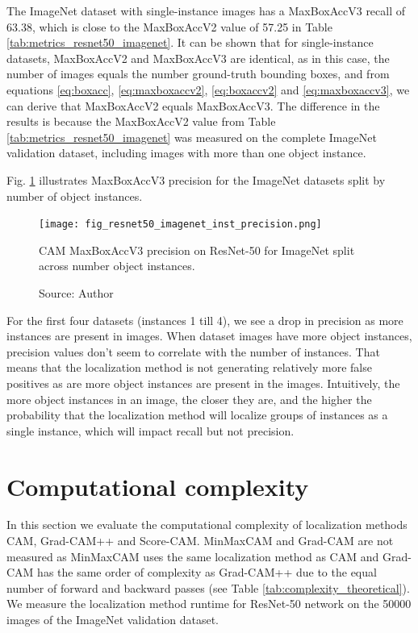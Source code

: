 The ImageNet dataset with single-instance images has a MaxBoxAccV3 recall of 63.38, which is close to the MaxBoxAccV2 value of 57.25 in Table \ref{tab:metrics_resnet50_imagenet}. It can be shown that for single-instance datasets, MaxBoxAccV2 and MaxBoxAccV3 are identical, as in this case, the number of images equals the number ground-truth bounding boxes, and from equations \ref{eq:boxacc}, \ref{eq:maxboxaccv2}, \ref{eq:boxaccv2} and \ref{eq:maxboxaccv3}, we can derive that MaxBoxAccV2 equals MaxBoxAccV3. The difference in the results is because the MaxBoxAccV2 value from Table \ref{tab:metrics_resnet50_imagenet} was measured on the complete ImageNet validation dataset, including images with more than one object instance.

Fig. \ref{fig:resnet50_imagenet_inst_precision} illustrates MaxBoxAccV3 precision for the ImageNet datasets split by number of object instances.

\begin{figure}[h]
    \begin{center}       
    \texttt{[image: fig\_resnet50\_imagenet\_inst\_precision.png]}
    \caption[CAM MaxBoxAccV3 precision on ResNet-50 for ImageNet split across number object instances]{CAM MaxBoxAccV3 precision on ResNet-50 for ImageNet split across number object instances.}
    \caption*{Source: Author}
    \label{fig:resnet50_imagenet_inst_precision}
    \end{center}
\end{figure}

For  the first four datasets (instances 1 till 4), we see a drop in precision as more instances are present in images. When dataset images have more object instances, precision values don't seem to correlate with the number of instances. That means that the localization method is not generating relatively more false positives as are more object instances are present in the images. Intuitively, the more object instances in an image, the closer they are, and the higher the probability that the localization method will localize groups of instances as a single instance, which will impact recall but not precision. 
 
\section{Computational complexity}
In this section we evaluate the computational complexity of localization methods CAM, Grad-CAM++ and Score-CAM. MinMaxCAM and Grad-CAM are not measured as MinMaxCAM uses the same localization method as CAM and Grad-CAM has the same order of complexity as Grad-CAM++ due to the equal number of forward and backward passes (see Table \ref{tab:complexity_theoretical}). We measure the localization method runtime for ResNet-50 network on the 50000 images of the ImageNet validation dataset. 

